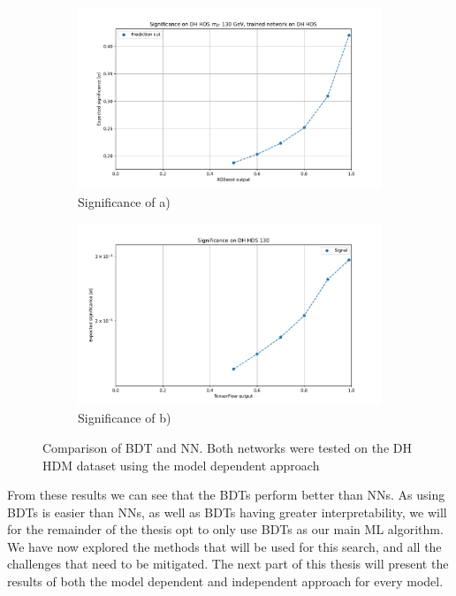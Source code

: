 \documentclass[12pt, a4paper]{book}
\begin{document}
\begin{figure}[!ht]
\begin{subfigure}[b]{0.49\textwidth}
      \centering
      \includegraphics[width=1\textwidth]{Pos_wgt/EXP_SIG.pdf}
      \caption{Significance of a)}
   \end{subfigure}
   \graphicspath{{../../../Plots/NeuralNetwork/Padding/}}
   \begin{subfigure}[b]{0.49\textwidth}
      \centering
      \includegraphics[width=1\textwidth]{New_pad/EXP_SIG.pdf}
      \caption{Significance of b)}
   \end{subfigure}
   \caption[Comparison of BDT and NN]{Comparison of BDT and NN. Both networks were tested on the DH HDM dataset using the model dependent approach}\label{fig:BDT_vs_NN}
\end{figure}
\noindent From these results we can see that the BDTs perform better than NNs. As using BDTs is easier than NNs, as well as BDTs having greater interpretability, we will for the remainder of the thesis opt to only use BDTs as our main ML algorithm. We have now explored the methods that will be used for this search, and all the challenges that need to be mitigated. The next part of this thesis will present 
the results of both the model dependent and independent approach for every model. 
\end{document}
